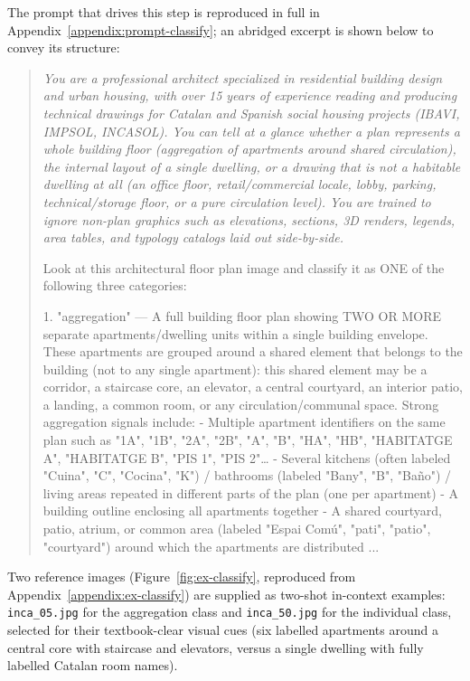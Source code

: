 \documentclass[12pt,a4paper,openright]{report}
\newcommand{\code}[1]{\texttt{#1}}
\begin{document}
The prompt that drives this step is reproduced in full in Appendix~\ref{appendix:prompt-classify}; an abridged excerpt is shown below to convey its structure:
\begin{quote}
\itshape
You are a professional architect specialized in residential building design and urban housing, with over 15 years of experience reading and producing technical drawings for Catalan and Spanish social housing projects (IBAVI, IMPSOL, INCASOL). You can tell at a glance whether a plan represents a whole building floor (aggregation of apartments around shared circulation), the internal layout of a single dwelling, or a drawing that is not a habitable dwelling at all (an office floor, retail/commercial locale, lobby, parking, technical/storage floor, or a pure circulation level). You are trained to ignore non-plan graphics such as elevations, sections, 3D renders, legends, area tables, and typology catalogs laid out side-by-side.

Look at this architectural floor plan image and classify it as ONE of the following three categories:

1. "aggregation" — A full building floor plan showing TWO OR MORE separate apartments/dwelling units within a single building envelope. These apartments are grouped around a shared element that belongs to the building (not to any single apartment): this shared element may be a corridor, a staircase core, an elevator, a central courtyard, an interior patio, a landing, a common room, or any circulation/communal space. Strong aggregation signals include:
   - Multiple apartment identifiers on the same plan such as "1A", "1B", "2A", "2B", "A", "B", "HA", "HB", "HABITATGE A", "HABITATGE B", "PIS 1", "PIS 2"…
   - Several kitchens (often labeled "Cuina", "C", "Cocina", "K") / bathrooms (labeled "Bany", "B", "Baño") / living areas repeated in different parts of the plan (one per apartment)
   - A building outline enclosing all apartments together
   - A shared courtyard, patio, atrium, or common area (labeled "Espai Comú", "pati", "patio", "courtyard") around which the apartments are distributed
...

\end{quote}



Two reference images (Figure~\ref{fig:ex-classify}, reproduced from Appendix~\ref{appendix:ex-classify}) are supplied as two-shot in-context examples: \code{inca\_05.jpg} for the aggregation class and \code{inca\_50.jpg} for the individual class, selected for their textbook-clear visual cues (six labelled apartments around a central core with staircase and elevators, versus a single dwelling with fully labelled Catalan room names).
\end{document}
